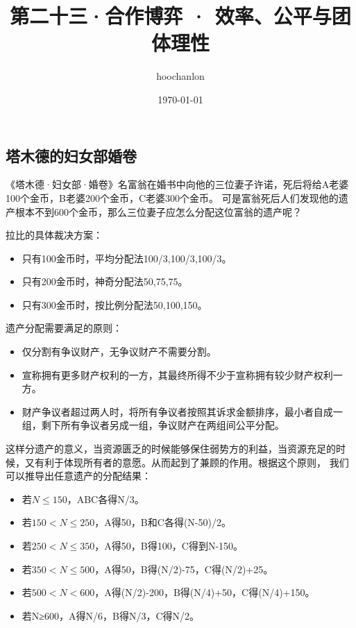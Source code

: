 \documentclass[12pt, a4paper]{article} %
\title{第二十三·合作博弈 · 效率、公平与团体理性}
\author{hoochanlon}
\date{\today}
\begin{document}
	\begin{CJK*}{UTF8}{gbsn}
		\maketitle
        \clearpage
        \section{塔木德的妇女部婚卷}
        《塔木德·妇女部·婚卷》名富翁在婚书中向他的三位妻子许诺，死后将给A老婆100个金币，B老婆200个金币，C老婆300个金币。
        可是富翁死后人们发现他的遗产根本不到600个金币，那么三位妻子应怎么分配这位富翁的遗产呢？ \par

        拉比的具体裁决方案：

        \begin{itemize}
            \item 只有100金币时，平均分配法100/3,100/3,100/3。
            \item 只有200金币时，神奇分配法50,75,75。
            \item 只有300金币时，按比例分配法50,100,150。
        \end{itemize}


        遗产分配需要满足的原则：

        \begin{itemize}
            \item 仅分割有争议财产，无争议财产不需要分割。
            \item 宣称拥有更多财产权利的一方，其最终所得不少于宣称拥有较少财产权利一方。
            \item 财产争议者超过两人时，将所有争议者按照其诉求金额排序，最小者自成一组，剩下所有争议者另成一组，争议财产在两组间公平分配。
        \end{itemize}

        这样分遗产的意义，当资源匮乏的时候能够保住弱势方的利益，当资源充足的时候，又有利于体现所有者的意愿。从而起到了兼顾的作用。根据这个原则，
        我们可以推导出任意遗产的分配结果：

        \begin{itemize}
            \item 若$N \leq 150$，ABC各得N/3。
            \item 若$150<N \leq 250$，A得50，B和C各得(N-50)/2。
            \item 若$250<N \leq 350$，A得50，B得100，C得到N-150。
            \item 若$350<N \leq 500$，A得50，B得(N/2)-75，C得(N/2)+25。
            \item 若$500<N<600$，A得(N/2)-200，B得(N/4)+50，C得(N/4)+150。
            \item 若N≥600，A得N/6，B得N/3，C得N/2。
        \end{itemize}


\end{CJK*}
\end{document}
